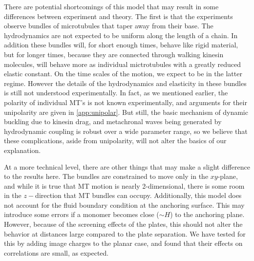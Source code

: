 \documentclass[11pt]{ucthesis}
\begin{document}
There are potential shortcomings of this model that may result in
some differences between experiment and theory. 
The first is that the experiments observe bundles of microtubules
that taper away from their base. The hydrodynamics are not
expected to be uniform along the length of a chain. In addition
these bundles will, for short enough times, behave like rigid
material, but for longer times, because they are connected through
walking kinesin molecules, will behave more as individual mictrotubules
with a greatly reduced elastic constant. On the time scales of the motion,
we expect to be in the latter regime. However the details of the
hydrodynamics and elasticity in these bundles is still not understood
experimentally. In fact, as we mentioned earlier, the polarity of
individual MT's is not known experimentally, and arguments for their
unipolarity are given in \ref{app:unipolar}.
But still, the basic mechanism of dynamic buckling due to kinesin drag, 
and metachronal waves being generated by hydrodynamic coupling is
robust over a wide parameter range, so we believe that these
complications, aside from unipolarity, will not alter the basics of our explanation.

At a more technical level, there are other things that may
make a slight difference to the results here.
The bundles are constrained to move only in the $xy$-plane, and
while it is true that MT motion is nearly 2-dimensional, there is
some room in the $z-$direction that MT bundles can occupy. Additionally,
this model does not account for the fluid boundary condition at the
anchoring surface. This may introduce some errors if a monomer
becomes close ($\sim H$) to the anchoring plane. However, because
of the screening effects of the plates, this should not alter the behavior
at distances large compared to the plate separation. We have tested
for this by adding image charges to the planar case, 
and found that their effects on correlations are small, as expected.
\end{document}
